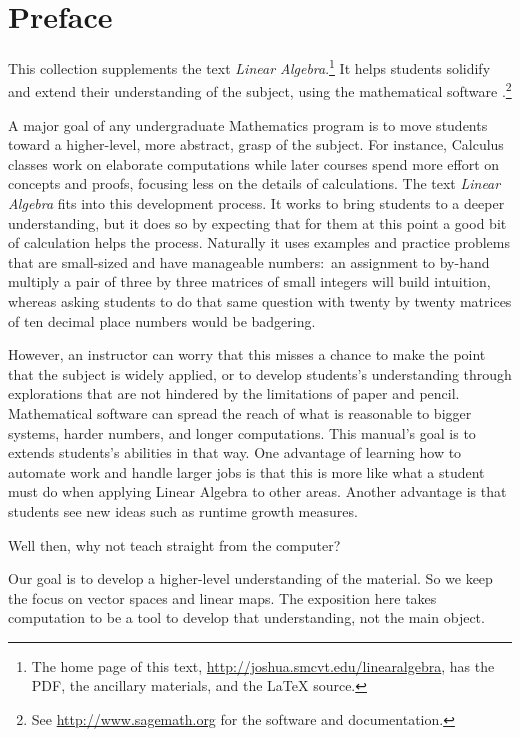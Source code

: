 \chapter*{Preface}\pagestyle{preface}\thispagestyle{preface}
\setlength{\parskip}{.25ex}


This collection supplements the text \nocite{Hefferon12}
\textit{Linear Algebra}.\footnote{The home page of this text, 
\protect\url{http://joshua.smcvt.edu/linearalgebra}, 
has the PDF, the ancillary materials, and the \protect\LaTeX{} source.}
It helps students
solidify and extend their understanding of the subject, 
using the mathematical software \Sage{}.\footnote{See 
\url{http://www.sagemath.org} for the software and documentation.}

A major goal of any undergraduate Mathematics program is to move students 
toward a higher-level, more abstract, grasp of the subject.
For instance, Calculus classes work on elaborate computations
while later courses spend more effort on concepts and proofs, focusing
less on the details of calculations.  
The text \textit{Linear Algebra} fits into
this development process.
It works to bring students to a deeper understanding, 
but it does so by expecting
that for them at this point a good bit of calculation helps the process. 
Naturally it uses examples and practice problems
that are small-sized and have manageable numbers:~an 
assignment to by-hand multiply a pair of three by three matrices
of small integers will build intuition, whereas asking students to do that same 
question with twenty by twenty matrices
of ten decimal place numbers would be badgering. 

However, an instructor can worry that this misses a chance 
to make the point that the subject is widely applied,
or to develop students's understanding through explorations that are not 
hindered by the limitations of paper and pencil. 
Mathematical software can spread the reach of
what is reasonable 
to bigger systems, harder numbers, and longer computations.
This manual's goal is to extends students's abilities in that way.
One advantage of learning how to automate work and
handle larger jobs is that 
this is more like what a student must do when applying Linear 
Algebra to other areas.
Another advantage is that students see new ideas such as 
runtime growth measures.

Well then, why 
not teach straight from the computer?

Our goal is to develop a higher-level understanding of the material. 
So we keep the focus on vector spaces and linear maps.
The exposition here takes computation to be
a tool to develop that understanding, not the main object.

